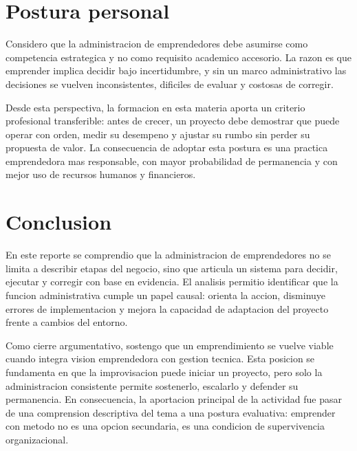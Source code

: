 \documentclass[
	spanish,
	letterpaper, oneside
]{article}
\begin{document}
\section{Postura personal}

Considero que la administracion de emprendedores debe asumirse como competencia estrategica y no como requisito academico accesorio. La razon es que emprender implica decidir bajo incertidumbre, y sin un marco administrativo las decisiones se vuelven inconsistentes, dificiles de evaluar y costosas de corregir.

Desde esta perspectiva, la formacion en esta materia aporta un criterio profesional transferible: antes de crecer, un proyecto debe demostrar que puede operar con orden, medir su desempeno y ajustar su rumbo sin perder su propuesta de valor. La consecuencia de adoptar esta postura es una practica emprendedora mas responsable, con mayor probabilidad de permanencia y con mejor uso de recursos humanos y financieros.

\section{Conclusion}

En este reporte se comprendio que la administracion de emprendedores no se limita a describir etapas del negocio, sino que articula un sistema para decidir, ejecutar y corregir con base en evidencia. El analisis permitio identificar que la funcion administrativa cumple un papel causal: orienta la accion, disminuye errores de implementacion y mejora la capacidad de adaptacion del proyecto frente a cambios del entorno.

Como cierre argumentativo, sostengo que un emprendimiento se vuelve viable cuando integra vision emprendedora con gestion tecnica. Esta posicion se fundamenta en que la improvisacion puede iniciar un proyecto, pero solo la administracion consistente permite sostenerlo, escalarlo y defender su permanencia. En consecuencia, la aportacion principal de la actividad fue pasar de una comprension descriptiva del tema a una postura evaluativa: emprender con metodo no es una opcion secundaria, es una condicion de supervivencia organizacional.



\end{document}
